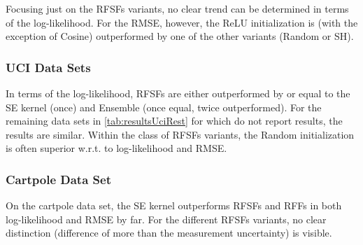 		Focusing just on the \acp{RFSF} variants, no clear trend can be determined in terms of the log-likelihood.
		For the \ac{RMSE}, however, the \ac{ReLU} initialization is (with the exception of Cosine) outperformed by one of the other variants (Random or \ac{SH}).

	\subsubsection{\acs{UCI} Data Sets}
		In terms of the log-likelihood, \acp{RFSF} are either outperformed by or equal to the \ac{SE} kernel (once) and Ensemble (once equal, twice outperformed).
		For the remaining data sets in \cref{tab:resultsUciRest} for which\cite{watsonLatentDerivativeBayesian2021} do not report results, the results are similar.
		Within the class of \acp{RFSF} variants, the Random initialization is often superior w.r.t. to log-likelihood and \ac{RMSE}.

	\subsubsection{Cartpole Data Set}
		On the cartpole data set, the \ac{SE} kernel outperforms \acp{RFSF} and \acp{RFF} in both log-likelihood and \ac{RMSE} by far.
		For the different \acp{RFSF} variants, no clear distinction (difference of more than the measurement uncertainty) is visible.

